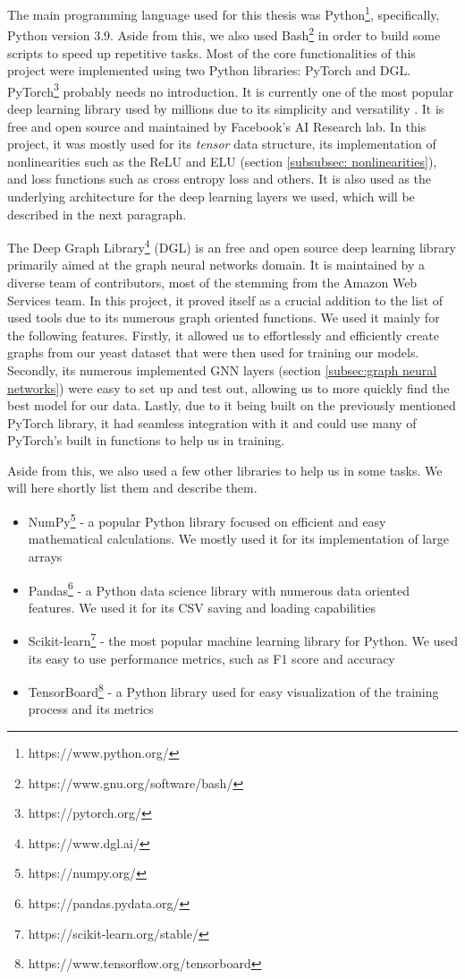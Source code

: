 \documentclass[times, utf8, diplomski, english]{fer_eng}
\begin{document}
The main programming language used for this thesis was Python\footnote{https://www.python.org/}, specifically, Python version 3.9. Aside from this, we also used Bash\footnote{https://www.gnu.org/software/bash/} in order to build some scripts to speed up repetitive tasks. Most of the core functionalities of this project were implemented using two Python libraries: PyTorch and DGL. PyTorch\footnote{https://pytorch.org/} probably needs no introduction. It is currently one of the most popular deep learning library used by millions due to its simplicity and versatility \cite{popular_ml}. It is free and open source and maintained by Facebook's AI Research lab. In this project, it was mostly used for its \textit{tensor} data structure, its implementation of nonlinearities such as the ReLU and ELU (section \ref{subsubsec: nonlinearities}), and loss functions such as cross entropy loss and others. It is also used as the underlying architecture for the deep learning layers we used, which will be described in the next paragraph.

The Deep Graph Library\footnote{https://www.dgl.ai/} (DGL) \cite{DGL} is an free and open source deep learning library primarily aimed at the graph neural networks domain. It is maintained by a diverse team of contributors, most of the stemming from the Amazon Web Services team. In this project, it proved itself as a crucial addition to the list of used tools due to its numerous graph oriented functions. We used it mainly for the following features. Firstly, it allowed us to effortlessly and efficiently create graphs from our yeast dataset that were then used for training our models. Secondly, its numerous implemented GNN layers (section \ref{subsec:graph neural networks}) were easy to set up and test out, allowing us to more quickly find the best model for our data. Lastly, due to it being built on the previously mentioned PyTorch library, it had seamless integration with it and could use many of PyTorch's built in functions to help us in training.

Aside from this, we also used a few other libraries to help us in some tasks. We will here shortly list them and describe them.

\begin{itemize}
	\item NumPy\footnote{https://numpy.org/} - a popular Python library focused on efficient and easy mathematical calculations. We mostly used it for its implementation of large arrays

	\item Pandas\footnote{https://pandas.pydata.org/} - a Python data science library with numerous data oriented features. We used it for its CSV saving and loading capabilities

	\item Scikit-learn\footnote{https://scikit-learn.org/stable/} - the most popular machine learning library for Python. We used its easy to use performance metrics, such as F1 score and accuracy

	\item TensorBoard\footnote{https://www.tensorflow.org/tensorboard} - a Python library used for easy visualization of the training process and its metrics
\end{itemize}
\end{document}
